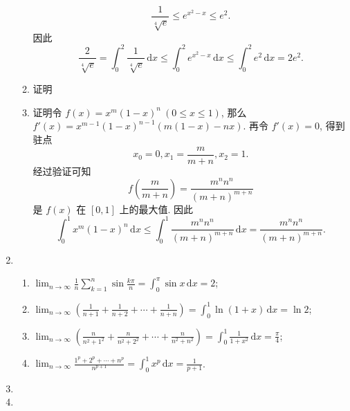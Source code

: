 \documentclass[a4paper, 11pt]{ctexart}
\newcommand{\dif}{\mathrm{d}}
\begin{document}
\begin{enumerate}
\begin{enumerate}[(1)]
                \[
                    \frac{1}{\sqrt[4]{e}} \leqslant e^{x^2-x} \leqslant e^2.  
                \] 因此
                \[
                    \frac{2}{\sqrt[4]{e}} = \int_0^2 \frac{1}{\sqrt[4]{e}}\,\dif x \leqslant \int_0^2 e^{x^2-x}\,\dif x \leqslant \int_0^2 e^2\,\dif x = 2e^2.  
                \]
            \item %
                {\heiti 证明}\quad
            \item %
                {\heiti 证明}\quad 令 $f(x) = x^m(1-x)^n\ (0 \leqslant x \leqslant 1)$, 那么 $f'(x) = x^{m-1}(1-x)^{n-1}(m(1-x) - nx)$. 再令 $f'(x) = 0$, 得到驻点
                \[
                    x_0 = 0, x_1 = \frac{m}{m+n}, x_2 = 1.    
                \]
                经过验证可知
                \[
                    f\left(\frac{m}{m+n}\right) = \frac{m^nn^n}{(m+n)^{m+n}}
                \]
                是 $f(x)$ 在 $[0, 1]$ 上的最大值. 因此
                \[
                    \int_0^1 x^m(1-x)^n\,\dif x \leqslant \int_0^1 \frac{m^nn^n}{(m+n)^{m+n}}\,\dif x = \frac{m^nn^n}{(m+n)^{m+n}}.  
                \]
        \end{enumerate}
    \item %
        \begin{enumerate}[(1)]
            \item %
                $\displaystyle{
                    \lim_{n\to\infty}\frac1n\sum_{k=1}^{n}\sin\frac{k\pi}{n} = \int_0^\pi\sin x\,\dif x = 2
                }$;
            \item %
                $\displaystyle{
                    \lim_{n\to\infty}\left(\frac{1}{n+1} + \frac{1}{n+2} + \cdots + \frac{1}{n+n}\right) = \int_0^1\ln(1+x)\,\dif x = \ln2
                }$;
            \item %
                $\displaystyle{
                    \lim_{n\to\infty}\left(\frac{n}{n^2+1^2} + \frac{n}{n^2+2^2} + \cdots + \frac{n}{n^2+n^2}\right) = \int_0^1\frac{1}{1+x^2}\,\dif x = \frac{\pi}{4}
                }$;
            \item %
                $\displaystyle{
                    \lim_{n\to\infty}\frac{1^p + 2^p + \cdots + n^p}{n^{p+1}} = \int_0^1x^p\,\dif x = \frac{1}{p+1}
                }$.
        \end{enumerate}
    \item %
    \item %
\end{enumerate}
\end{document}
